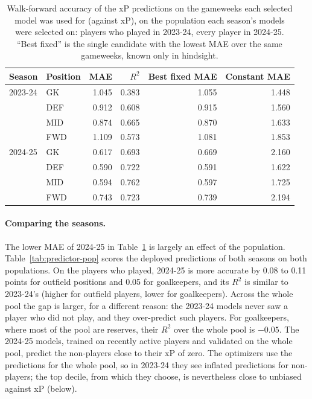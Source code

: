 \documentclass[12pt,oneside,a4paper]{book}
\theoremstyle{definition}
\theoremstyle{remark}
\begin{document}
	\begin{table}[ht]
		\centering
		\caption{Walk-forward accuracy of the xP predictions on the gameweeks each selected model was
			used for (against xP), on the population each season's models were selected on: players who
			played in 2023-24, every player in 2024-25. ``Best fixed'' is the single candidate with the
			lowest MAE over the same gameweeks, known only in hindsight.}
		\label{tab:predictor-mae}
		\begin{tabular}{llrrrr}
			\toprule
			Season & Position & MAE & $R^2$ & Best fixed MAE & Constant MAE \\
			\midrule
			2023-24 & GK  & 1.045 & 0.383 & 1.055 & 1.448 \\
			& DEF & 0.912 & 0.608 & 0.915 & 1.560 \\
			& MID & 0.874 & 0.665 & 0.870 & 1.633 \\
			& FWD & 1.109 & 0.573 & 1.081 & 1.853 \\
			\midrule
			2024-25 & GK  & 0.617 & 0.693 & 0.669 & 2.160 \\
			& DEF & 0.590 & 0.722 & 0.591 & 1.622 \\
			& MID & 0.594 & 0.762 & 0.597 & 1.725 \\
			& FWD & 0.743 & 0.723 & 0.739 & 2.194 \\
			\bottomrule
		\end{tabular}
	\end{table}

	\paragraph{Comparing the seasons.} The lower MAE of 2024-25 in Table~\ref{tab:predictor-mae}
	is largely an effect of the population. Table~\ref{tab:predictor-pop} scores the deployed
	predictions of both seasons on both populations. On the players who played, 2024-25 is more
	accurate by 0.08 to 0.11 points for outfield positions and 0.05 for goalkeepers, and its $R^2$
	is similar to 2023-24's (higher for outfield players, lower for goalkeepers). Across the whole
	pool the gap is larger, for a different reason: the 2023-24 models never saw a player who did
	not play, and they over-predict such players. For goalkeepers, where most of the pool are
	reserves, their $R^2$ over the whole pool is $-0.05$. The 2024-25 models, trained on recently
	active players and validated on the whole pool, predict the non-players close to their xP of
	zero. The optimizers use the predictions for the whole pool, so in 2023-24 they see inflated
	predictions for non-players; the top decile, from which they choose, is nevertheless close to
	unbiased against xP (below).
\end{document}
